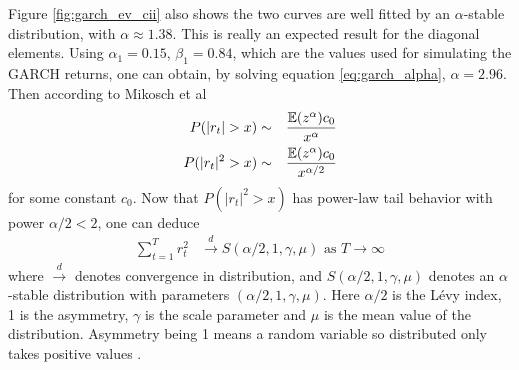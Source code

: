 \documentclass{report}
\begin{document}
Figure \ref{fig:garch_ev_cii} also shows the two curves are well fitted
by an $\alpha$-stable distribution, with $\alpha \approx 1.38$. This
is really an expected result for the diagonal elements. Using
$\alpha_1 = 0.15$, $\beta_1 = 0.84$, which are the values used for
simulating the GARCH returns, one can obtain, by solving equation
\ref{eq:garch_alpha}, $\alpha=2.96$. Then according to Mikosch et al
\cite{mikosch2000}
\begin{eqnarray*}
  P(|r_t| > x) &\sim& {\mathbb{E}(z^\alpha) c_0 \over x^\alpha} \\
  P(|r_t|^2 > x) &\sim& {\mathbb{E}(z^\alpha) c_0 \over x^{\alpha/2}} \\
\end{eqnarray*}
for some constant $c_0$. Now that $P(|r_t|^2 > x)$ has power-law tail
behavior with power $\alpha/2 < 2$, one can deduce
\begin{equation}
  \label{eq:stable_CLT}
  \begin{aligned}
    \sum_{t=1}^T r_t^2 &\xrightarrow{d} S(\alpha/2,
    1, \gamma, \mu) \text{ as $T \to \infty$}
  \end{aligned}
\end{equation}
where $\xrightarrow{d}$ denotes convergence in distribution, and
$S(\alpha/2, 1, \gamma, \mu)$ denotes an $\alpha$-stable distribution
with parameters $(\alpha/2, 1, \gamma, \mu)$. Here $\alpha/2$ is the
L\'evy index, 1 is the asymmetry, $\gamma$ is the scale parameter
and $\mu$ is the mean value of the distribution. Asymmetry being 1
means a random variable so distributed only takes positive values
\cite{Bilik2008, Embrechts1997}.
\end{document}

